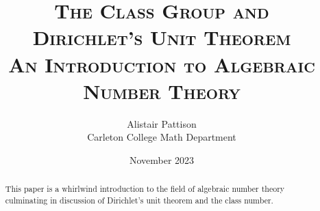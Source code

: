 \documentclass[titlepage]{article}
\title{\scshape
	The Class Group and \\
	Dirichlet's Unit Theorem \\[1em]
	\large An Introduction to Algebraic Number Theory
}
\author{Alistair Pattison \\ {\small Carleton College Math Department}}
\date{November 2023}
\begin{document}
\maketitle

\begin{abstract}
    This paper is a whirlwind introduction to the field of algebraic number theory culminating in discussion of Dirichlet's unit theorem and the class number.
\end{abstract}

\tableofcontents
\thispagestyle{empty}

\newpage

\pagestyle{fancy}
\setcounter{page}{1}









\clearpage

\printbibliography
\end{document}
